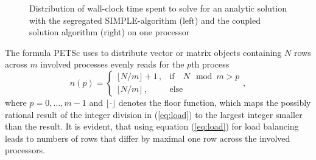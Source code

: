 \begin{figure}[!h]
  \centering
  \begin{minipage}{0.45\textwidth}
\hfil
\end{minipage}
  \begin{minipage}{0.45\textwidth}
\end{minipage}
\caption{Distribution of wall-clock time spent to solve for an analytic solution with the segregated SIMPLE-algorithm (left) and the coupled solution algorithm (right) on one processor}
\label{fig:barbalance}
\end{figure}

The formula PETSc uses to distribute vector or matrix objects containing \(N\) rows across \(m\) involved processes evenly reads for the \(p\)th process
\begin{equation}
  \label{eq:load}
n(p)
=
\left\{\begin{array}{ll} 
    \lfloor N/m \rfloor + 1\,, & \text{if} \quad  N \mod m > p \\
    \lfloor N/m \rfloor \,, & \text{else}
\end{array}\right.
,
\end{equation}
where \(p = 0,\dots,m-1\) and \(\lfloor \cdot \rfloor\) denotes the floor function, which maps the possibly rational result of the integer division in (\ref{eq:load}) to the largest integer smaller than the result. It is evident, that using equation (\ref{eq:load}) for load balancing leads to numbers of rows that differ by maximal one row across the involved processors.

